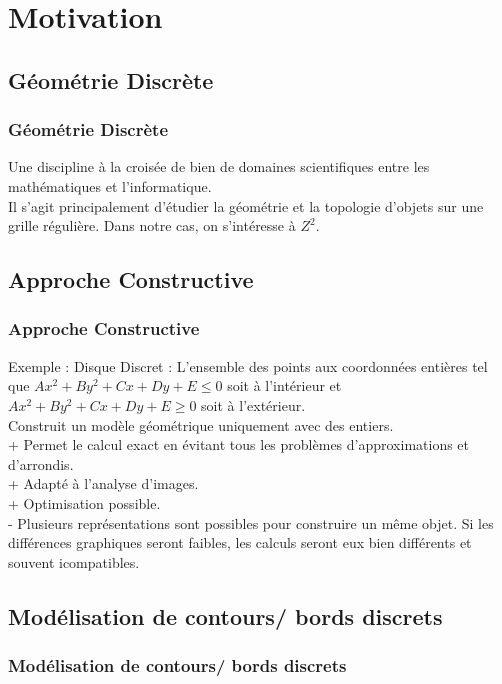 \documentclass{beamer}
\begin{document}
\section{Motivation} 

\subsection{Géométrie Discrète} 
\begin{frame}
\frametitle{Géométrie Discrète}
Une discipline à la croisée de bien de domaines scientifiques entre les mathématiques et l'informatique.\\
Il s'agit principalement d'étudier la géométrie et la topologie d'objets sur une grille régulière. Dans notre cas, on s'intéresse à $Z^2$.
\end{frame}

\subsection{Approche Constructive}
\begin{frame}
\frametitle{Approche Constructive}
Exemple : Disque Discret : L'ensemble des points aux coordonnées entières tel que $Ax^2+By^2 + Cx + Dy + E \leq 0$ soit à l'intérieur et $Ax^2+By^2 + Cx + Dy + E \geq 0$ soit à l'extérieur.\\
Construit un modèle géométrique uniquement avec des entiers.\\
+ Permet le calcul exact en évitant tous les problèmes d'approximations et d'arrondis.\\
+ Adapté à l'analyse d'images.\\
+ Optimisation possible.\\
- Plusieurs représentations sont possibles pour construire un même objet. Si les différences graphiques seront faibles, les calculs seront eux bien différents et souvent icompatibles.
\end{frame}

\subsection{Modélisation de contours/ bords discrets} 
\begin{frame}
\frametitle{Modélisation de contours/ bords discrets}
\end{frame}

\end{document}
